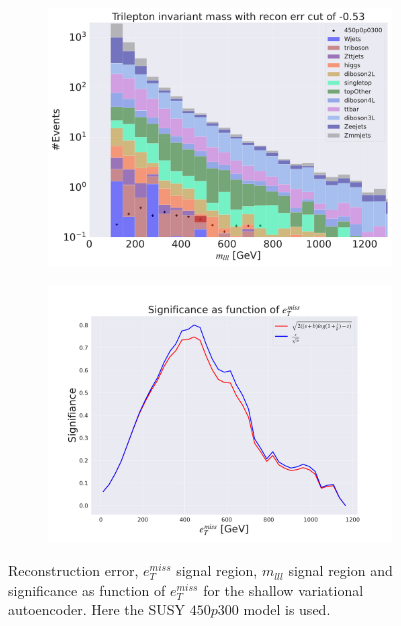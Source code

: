 \begin{figure}[H]
    \hfill
    \begin{subfigure}{.49\textwidth}
        \includegraphics[width=\textwidth]{Figures/VAE_testing/small/3lep/b_data_recon_big_rm3_feats_sig_450p0p0300_mlll_recon_errcut_-0.53.pdf}
        \caption{}
        \label{fig:VAE_3lep_small_mlll_450_3}
    \end{subfigure}
    \hfill   
    \begin{subfigure}{.49\textwidth}
        \includegraphics[width=\textwidth]{Figures/VAE_testing/small/3lep/significance_etmiss_450p0p0300_-0.530518613616577.pdf}
        \caption{}
        \label{fig:VAE_3lep_small_signi_450_3}
    \end{subfigure}
    \hfill      
    \caption[3lep shallow network | $450p300$ | VAE | 3]{Reconstruction error, $e_T^{miss}$ signal region, $m_{lll}$ signal region and significance as function of 
    $e_T^{miss}$ for the shallow variational autoencoder. Here the SUSY $450p300$ model is used.}
    \label{fig:VAE_3lep_small_rec_sig_signi_450_3}
\end{figure}








